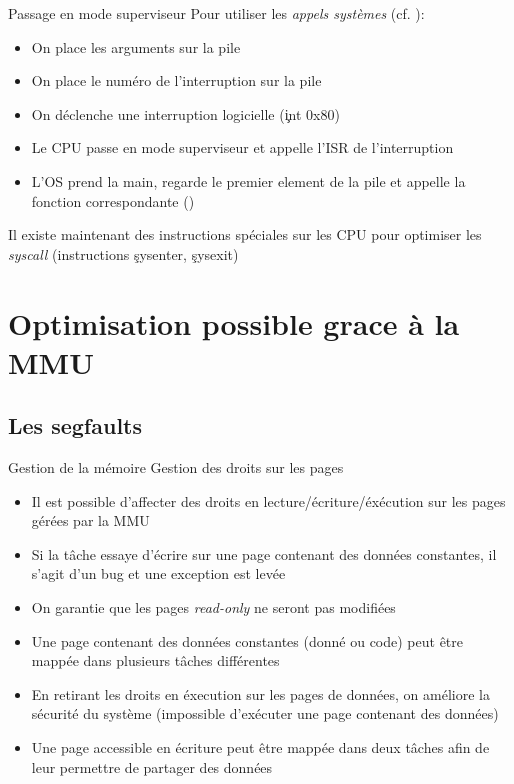\begin{frame}{Passage en mode superviseur}
  Pour utiliser les \emph{appels systèmes} (cf. ):
  \begin{itemize}
  \item On place les arguments sur la pile
  \item On place le numéro de l'interruption sur la pile
  \item On déclenche une interruption logicielle (\c{int 0x80})
  \item  Le  CPU  passe  en  mode  superviseur  et  appelle  l'ISR  de
    l'interruption
  \item L'OS prend  la main, regarde le premier element  de la pile et
    appelle la fonction correspondante ()
  \end{itemize}
  Il  existe maintenant des  instructions spéciales  sur les  CPU pour
  optimiser    les    \emph{syscall}    (instructions    \c{sysenter},
  \c{sysexit})
\end{frame}

\section{Optimisation possible grace à la MMU}

\subsection{Les segfaults}

\begin{frame}{Gestion de la mémoire}
  Gestion des droits sur les pages
  \begin{itemize}
  \item    Il    est     possible    d'affecter    des    droits    en
    lecture/écriture/éxécution sur les pages gérées par la MMU
  \item Si la tâche essaye d'écrire sur une page contenant des données
    constantes, il s'agit d'un bug et une exception est levée
  \item  On garantie  que  les pages  \emph{read-only}  ne seront  pas
    modifiées
  \item Une page contenant des données constantes (donné ou code) peut
    être mappée dans plusieurs tâches différentes
  \item En retirant les droits  en éxecution sur les pages de données,
    on améliore la sécurité du système (impossible d'exécuter une page
    contenant des données)
  \item Une  page accessible  en écriture peut  être mappée  dans deux
    tâches afin de leur permettre de partager des données
  \end{itemize}
\end{frame}

